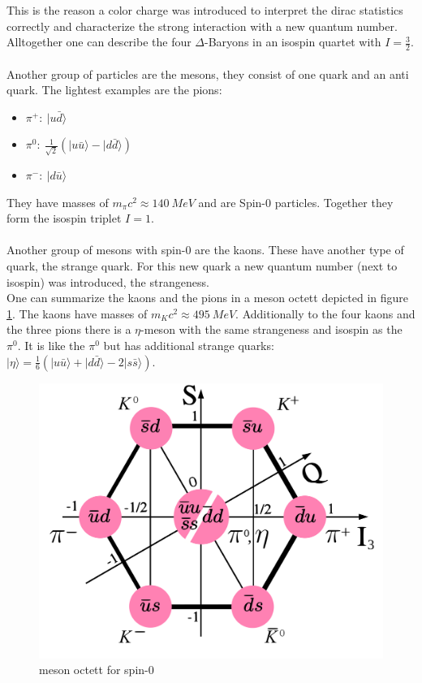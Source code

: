 \documentclass{include/thesisclass}
\newcommand{\rk}{\rangle}
\begin{document}
This is the reason a color charge was introduced to interpret the dirac statistics correctly and characterize the strong interaction with a new quantum number.\\
Alltogether one can describe the four $\Delta$-Baryons in an isospin quartet with $I = \frac{3}{2}$.\\
\\
Another group of particles are the mesons, they consist of one quark and an anti quark. The lightest examples are the pions:
\begin{itemize}
\item $\pi^+:~|u\bar{d}\rk$
\item $\pi^0:~\frac{1}{\sqrt{2}}\left( |u\bar{u}\rk - |d \bar{d}\rk\right)$
\item $\pi^-:~|d\bar{u}\rk$
\end{itemize}
They have masses of $m_\pi c^2 \approx 140~\si{MeV}$ and are Spin-$0$ particles. Together they form the isospin triplet $I = 1$.\\
\\
Another group of mesons with spin-$0$ are the kaons. These have another type of quark, the strange quark. For this new quark a new quantum number (next to isospin) was introduced, the strangeness.\\
One can summarize the kaons and the pions in a meson octett depicted in figure \ref{1}. The kaons have masses of $m_Kc^2 \approx 495~\si{MeV}$. Additionally to the four kaons and the three pions there is a $\eta$-meson with the same strangeness and isospin as the $\pi^0$. It is like the $\pi^0$ but has additional strange quarks: $|\eta\rk = \frac{1}{6}\left( |u\bar{u}\rk + |d\bar{d}\rk - 2 | s \bar{s}\rk\right)$.\\
\begin{figure}[H]
\centering
\includegraphics[scale=0.1]{include/mesonoctett.pdf}
\caption{meson octett for spin-$0$}
\label{1}
\end{figure}
\end{document}
